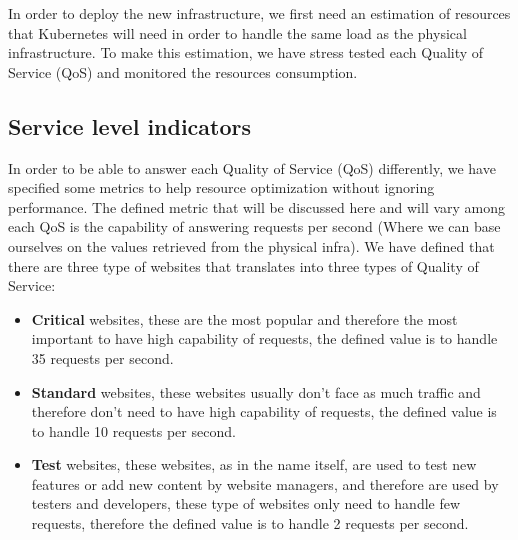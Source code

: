 \newenvironment{conditions}
  {\par\vspace{\abovedisplayskip}\noindent\begin{tabular}{>{$}l<{$} @{${}={}$} l}}
  {\end{tabular}\par\vspace{\belowdisplayskip}}

In order to deploy the new infrastructure, we first need an estimation of resources that Kubernetes will need in order to handle the same load as the physical infrastructure.
To make this estimation, we have stress tested each Quality of Service (QoS) and monitored the resources consumption.

\subsection{Service level indicators}

In order to be able to answer each Quality of Service (QoS) differently, we have specified some metrics to help resource optimization without ignoring performance.
The defined metric that will be discussed here and will vary among each QoS is the capability of answering requests per second (Where we can base ourselves on the values retrieved from the physical infra).
We have defined that there are three type of websites that translates into three types of Quality of Service:
\begin{itemize}
    \item \textbf{Critical} websites, these are the most popular and therefore the most important to have high capability of requests, the defined value is to handle 35 requests per second.
    \item \textbf{Standard} websites, these websites usually don't face as much traffic and therefore don't need to have high capability of requests, the defined value is to handle 10 requests per second. 
    \item \textbf{Test} websites, these websites, as in the name itself, are used to test new features or add new content by website managers, and therefore are used by testers and developers, these type of websites only need to handle few requests, therefore the defined value is to handle 2 requests per second.
\end{itemize}


